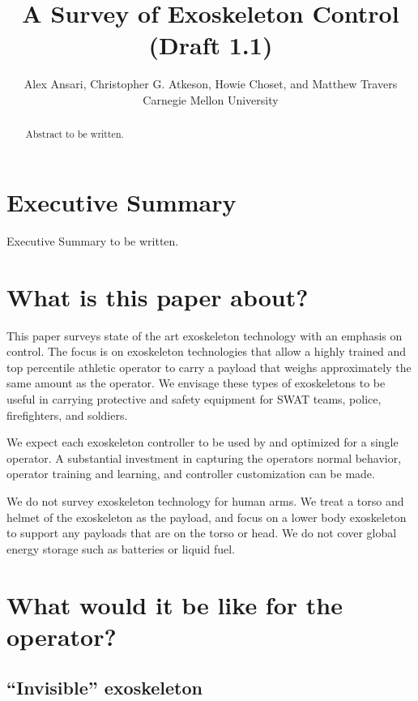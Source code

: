 \documentclass[letterpaper,12pt,fullpage]{article}
\begin{document}
\title{A Survey of Exoskeleton Control (Draft 1.1)}

\author{Alex Ansari, Christopher G. Atkeson, Howie Choset, and Matthew Travers\\
Carnegie Mellon University}

\maketitle

\begin{abstract}
Abstract to be written.
\end{abstract}

\section{Executive Summary}

Executive Summary to be written.

\section{What is this paper about?}

This paper surveys state of the art exoskeleton technology with an
emphasis on control. The focus is on exoskeleton technologies that allow a
highly trained and top percentile athletic 
operator to carry a payload that weighs approximately the same amount
as the operator. We envisage these types of exoskeletons to be useful
in carrying protective and safety equipment for SWAT teams, police,
firefighters, and soldiers. 

We expect each exoskeleton controller
to be used by and optimized for a single operator.
A substantial investment in capturing the operators normal behavior,
operator training and learning, and controller customization can be made.

We do not survey exoskeleton technology for human arms. 
We treat a torso and helmet of the exoskeleton as the payload,
and focus on a lower body exoskeleton to support any payloads that
are on the torso or head.
We do not cover global energy storage such as batteries or liquid fuel.

\section{What would it be like for the operator?}

\subsection{``Invisible'' exoskeleton}
\end{document}
